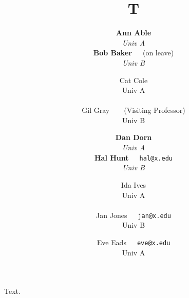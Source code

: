 \documentclass{article}
\title{T}
\author{{\bf Ann Able} \\
{\it Univ A} \\
{\bf Bob Baker}\ \ \ {\small (on leave)} \\
{\it Univ B}
\and Cat Cole \\
Univ A \\
\\
Gil Gray~~~~(Visiting Professor) \\
Univ B
\and {\bf Dan Dorn} \\
{\it Univ A} \\
{\bf Hal Hunt}~~~{\tt hal@x.edu} \\
{\it Univ B}
\and Ida Ives \\
Univ A \\
\\
Jan Jones\ \ \ \texttt{jan@x.edu} \\
Univ B
\and Eve Eads~~~\texttt{eve@x.edu} \\
Univ A}
\begin{document}
\maketitle
Text.
\end{document}
